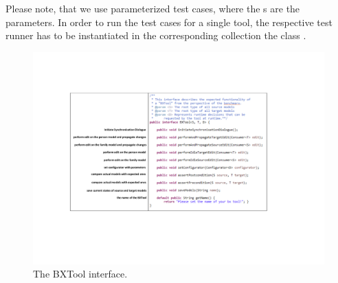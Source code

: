 Please note, that we use parameterized test cases, where the s are the parameters. In order to run the test cases for a single tool, the respective test runner has to be instantiated in the corresponding collection the class . 

\begin{figure}[tb!]
	\centering
	\includegraphics[width=\columnwidth]{diagrams/BXTool}
	\caption{The BXTool interface.}
	\label{fig:refImplementation}
\end{figure}



